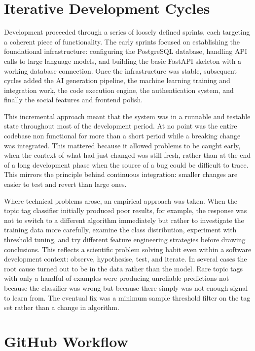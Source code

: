 \section{Iterative Development Cycles}

Development proceeded through a series of loosely defined sprints, each
targeting a coherent piece of functionality. The early sprints focused on
establishing the foundational infrastructure: configuring the PostgreSQL
database, handling API calls to large language models, and building the
basic FastAPI skeleton with a working database connection. Once the
infrastructure was stable, subsequent cycles added the AI generation
pipeline, the machine learning training and integration work, the code
execution engine, the authentication system, and finally the social
features and frontend polish.

This incremental approach meant that the system was in a runnable and
testable state throughout most of the development period. At no point was
the entire codebase non functional for more than a short period while a
breaking change was integrated. This mattered because it allowed problems
to be caught early, when the context of what had just changed was still
fresh, rather than at the end of a long development phase when the source
of a bug could be difficult to trace. This mirrors the principle behind continuous integration: smaller changes are easier to test and revert than large ones.

Where technical problems arose, an empirical approach was taken. When the
topic tag classifier initially produced poor results, for example, the
response was not to switch to a different algorithm immediately but rather
to investigate the training data more carefully, examine the class
distribution, experiment with threshold tuning, and try different feature
engineering strategies before drawing conclusions. This reflects a
scientific problem solving habit even within a software development
context: observe, hypothesise, test, and iterate. In several cases the
root cause turned out to be in the data rather than the model. Rare topic
tags with only a handful of examples were producing unreliable predictions
not because the classifier was wrong but because there simply was not
enough signal to learn from. The eventual fix was a minimum sample
threshold filter on the tag set rather than a change in algorithm.

\section{GitHub Workflow}

